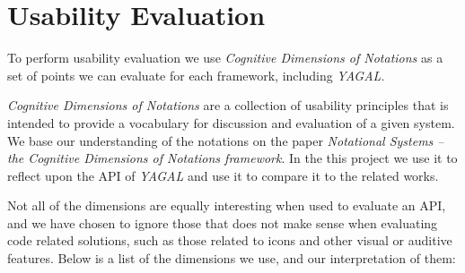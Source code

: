 \section{Usability Evaluation}
To perform usability evaluation we use \textit{Cognitive Dimensions of Notations} as a set of points we can evaluate for each framework, including \textit{YAGAL}.

\textit{Cognitive Dimensions of Notations} are a collection of usability principles that is intended to provide a vocabulary for discussion and evaluation of a given system. We base our understanding of the notations on the paper \textit{Notational Systems – the Cognitive Dimensions of Notations framework}\cite{cogDimUsage}. In the this project we use it to reflect upon the API of \textit{YAGAL} and use it to compare it to the related works.

Not all of the dimensions are equally interesting when used to evaluate an API, and we have chosen to ignore those that does not make sense when evaluating code related solutions, such as those related to icons and other visual or auditive features. Below is a list of the dimensions we use, and our interpretation of them:

